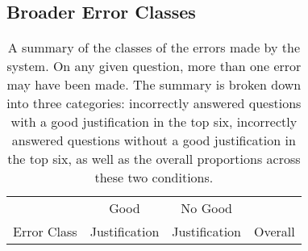 \subsection{Broader Error Classes}

\begin{table}[!tb]

\caption{{  A summary of the classes of the errors made by the system. On any given question, more than one error may have been made. The summary is broken down into three categories: incorrectly answered questions with a good justification in the top six, incorrectly answered questions without a good justification in the top six, as well as the overall proportions across these two conditions.}} 
\small
\begin{center}
\begin{tabular}{lccc}

\hline
\multicolumn{1}{c}{} & \multicolumn{1}{c}{Good} &\multicolumn{1}{c}{No Good} & \multicolumn{1}{c}{}  \\
\multicolumn{1}{l}{Error Class} & \multicolumn{1}{c}{Justification} &\multicolumn{1}{c}{Justification} & \multicolumn{1}{c}{Overall}  \\


\end{tabular}
\end{center}
\end{table}
